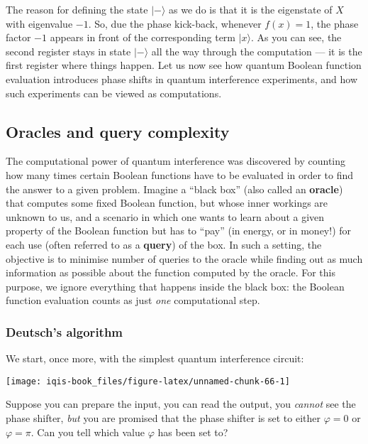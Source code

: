 \documentclass[fleqn]{article}
\begin{document}
The reason for defining the state \(|-\rangle\) as we do is that it is the eigenstate of \(X\) with eigenvalue \(-1\).
So, due the phase kick-back, whenever \(f(x)=1\), the phase factor \(-1\) appears in front of the corresponding term \(|x\rangle\).
As you can see, the second register stays in state \(|-\rangle\) all the way through the computation --- it is the first register where things happen.
Let us now see how quantum Boolean function evaluation introduces phase shifts in quantum interference experiments, and how such experiments can be viewed as computations.

\hypertarget{oracles-and-query-complexity}{%
\subsection{Oracles and query complexity}\label{oracles-and-query-complexity}}

The computational power of quantum interference was discovered by counting how many times certain Boolean functions have to be evaluated in order to find the answer to a given problem.
Imagine a ``black box'' (also called an \textbf{oracle}) that computes some fixed Boolean function, but whose inner workings are unknown to us, and a scenario in which one wants to learn about a given property of the Boolean function but has to ``pay'' (in energy, or in money!) for each use (often referred to as a \textbf{query}) of the box.
In such a setting, the objective is to minimise number of queries to the oracle while finding out as much information as possible about the function computed by the oracle.
For this purpose, we ignore everything that happens inside the black box: the Boolean function evaluation counts as just \emph{one} computational step.

\hypertarget{deutschs-algorithm}{%
\subsubsection{Deutsch's algorithm}\label{deutschs-algorithm}}

We start, once more, with the simplest quantum interference circuit:

\begin{center}\texttt{[image: iqis-book\_files/figure-latex/unnamed-chunk-66-1]} \end{center}

Suppose you can prepare the input, you can read the output, you \emph{cannot} see the phase shifter, \emph{but} you are promised that the phase shifter is set to either \(\varphi=0\) or \(\varphi=\pi\).
Can you tell which value \(\varphi\) has been set to?
\end{document}
